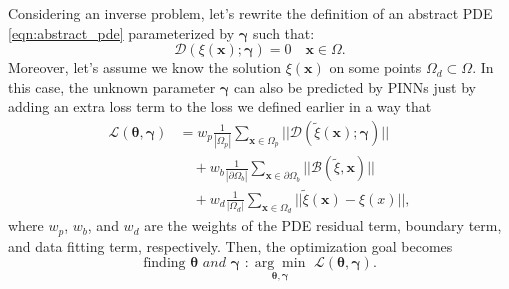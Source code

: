 Considering an inverse problem, let's rewrite the definition of an abstract PDE \eqref{eqn:abstract_pde} parameterized by $\boldsymbol\gamma$ such that:
\begin{equation}
    \label{eqn:gamma_pde}
    \mathcal{D}(\xi(\mathbf{x});\boldsymbol\gamma)=0 \quad \mathbf{x} \in \Omega.
\end{equation}
Moreover, let's assume we know the solution $\xi(\mathbf{x})$ on some points $\Omega_d \subset \Omega$. In this case, the unknown parameter $\boldsymbol \gamma$ can also be predicted by PINNs just by adding an extra loss term to the loss we defined earlier in a way that 
\begin{equation}
\label{eqn:total_loss}
\begin{split}
       \mathcal{L}(\boldsymbol\theta, \boldsymbol \gamma) &= w_p \frac{1}{|\Omega_p|}\sum_{\mathbf{x} \in \Omega_p} ||\mathcal{D}(\tilde{\xi}(\mathbf{x}); \boldsymbol \gamma)||\\&\quad +w_b \frac{1}{|\partial \Omega_b|}\sum_{\mathbf{x} \in \partial \Omega_b} ||\mathcal{B}(\tilde{\xi},\mathbf{x})||\\&\quad   + w_d \frac{1}{|\Omega_d|}\sum_{\mathbf{x} \in \Omega_d} ||\tilde{\xi}(\mathbf{x})-\xi(x)||,
\end{split}
\end{equation}
where $w_p$, $w_b$, and $w_d$ are the weights of the PDE residual term, boundary term, and data fitting term, respectively. Then, the optimization goal becomes
\begin{equation}
    \label{eqn:optimization}
    \text{finding} \,\, \boldsymbol\theta \,\, and \,\, \boldsymbol\gamma \,\, :     \underset{\boldsymbol\theta,\boldsymbol\gamma}{\arg\min}\,\, \mathcal{L}(\boldsymbol\theta,\boldsymbol\gamma). 
\end{equation}